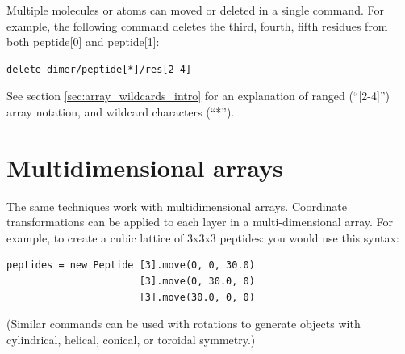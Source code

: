 \documentclass[11pt]{article}
\begin{document}
Multiple molecules or atoms can moved or deleted in a single command.
For example,
the following command deletes the third, fourth, fifth residues from 
both peptide[0] and peptide[1]:
\begin{verbatim}
delete dimer/peptide[*]/res[2-4]
\end{verbatim}
See section \ref{sec:array_wildcards_intro} for an
explanation of ranged (``[2-4]'') array notation, 
and wildcard characters (``*'').




%




\section{Multidimensional arrays}
\label{sec:multidimensional_arrays}
The same techniques work with multidimensional arrays.
Coordinate transformations can be applied to each layer
in a multi-dimensional array.
For example, to create a cubic lattice of 3x3x3 peptides:
you would use this syntax:
\begin{verbatim}
peptides = new Peptide [3].move(0, 0, 30.0)
                       [3].move(0, 30.0, 0)
                       [3].move(30.0, 0, 0)
\end{verbatim}
(Similar commands can be used with rotations to generate objects
with cylindrical, helical, conical, or toroidal symmetry.)
\end{document}
